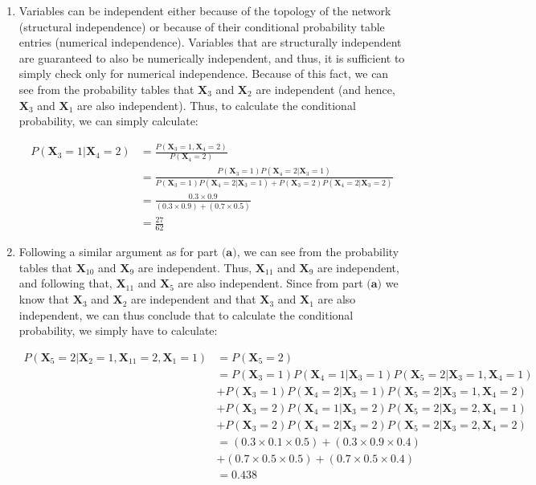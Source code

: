 \documentclass[11pt,fancychapters]{article}
\begin{document}
\begin{enumerate}[label=\textbf{(\alph*)}]
	\item Variables can be independent either because of the topology of the network (structural independence) or because of their conditional probability table entries (numerical independence). Variables that are structurally independent are guaranteed to also be numerically independent, and thus, it is sufficient to simply check only for numerical independence. Because of this fact, we can see from the probability tables that $\mathbf{X}_3$ and $\mathbf{X}_2$ are independent (and hence, $\mathbf{X}_3$ and $\mathbf{X}_1$ are also independent). Thus, to calculate the conditional probability, we can simply calculate:
	
	\begin{align*}
		P(\mathbf{X}_3 = 1 | \mathbf{X}_4 = 2) &= \frac{P(\mathbf{X}_3 = 1, \mathbf{X}_4 = 2)}{P(\mathbf{X}_4 = 2)} \\
		&= \frac{P(\mathbf{X}_3 = 1)P(\mathbf{X}_4 = 2 | \mathbf{X}_3 = 1)}{P(\mathbf{X}_3 = 1)P(\mathbf{X}_4 = 2 | \mathbf{X}_3 = 1) + P(\mathbf{X}_3 = 2)P(\mathbf{X}_4 = 2 | \mathbf{X}_3 = 2)} \\
		&= \frac{0.3 \times 0.9}{(0.3 \times 0.9) + (0.7 \times 0.5)} \\
		&= \frac{27}{62}
	\end{align*}
	
	\item Following a similar argument as for part $\textbf{(a)}$, we can see from the probability tables that $\mathbf{X}_{10}$ and $\mathbf{X}_{9}$ are independent. Thus, $\mathbf{X}_{11}$ and $\mathbf{X}_{9}$ are independent, and following that, $\mathbf{X}_{11}$ and $\mathbf{X}_{5}$ are also independent. Since from part $\textbf{(a)}$ we know that $\mathbf{X}_3$ and $\mathbf{X}_2$ are independent and that $\mathbf{X}_3$ and $\mathbf{X}_1$ are also independent, we can thus conclude that to calculate the conditional probability, we simply have to calculate:
	
	\begin{align*}
		P(\mathbf{X}_5 = 2 | \mathbf{X}_2 = 1, \mathbf{X}_{11} = 2, \mathbf{X}_1 = 1) &= P(\mathbf{X}_5 = 2) \\
		&= P(\mathbf{X}_3 = 1)P(\mathbf{X}_4 = 1 | \mathbf{X}_3 = 1)P(\mathbf{X}_5 = 2 | \mathbf{X}_3 = 1, \mathbf{X}_4 = 1) \\
		&+ P(\mathbf{X}_3 = 1)P(\mathbf{X}_4 = 2 | \mathbf{X}_3 = 1)P(\mathbf{X}_5 = 2 | \mathbf{X}_3 = 1, \mathbf{X}_4 = 2) \\
		&+ P(\mathbf{X}_3 = 2)P(\mathbf{X}_4 = 1 | \mathbf{X}_3 = 2)P(\mathbf{X}_5 = 2 | \mathbf{X}_3 = 2, \mathbf{X}_4 = 1) \\
		&+ P(\mathbf{X}_3 = 2)P(\mathbf{X}_4 = 2 | \mathbf{X}_3 = 2)P(\mathbf{X}_5 = 2 | \mathbf{X}_3 = 2, \mathbf{X}_4 = 2) \\
		&= (0.3 \times 0.1 \times 0.5) + (0.3 \times 0.9 \times 0.4) \\
		&+ (0.7 \times 0.5 \times 0.5) + (0.7 \times 0.5 \times 0.4) \\
		&= 0.438
	\end{align*}
\end{enumerate}
\end{document}
